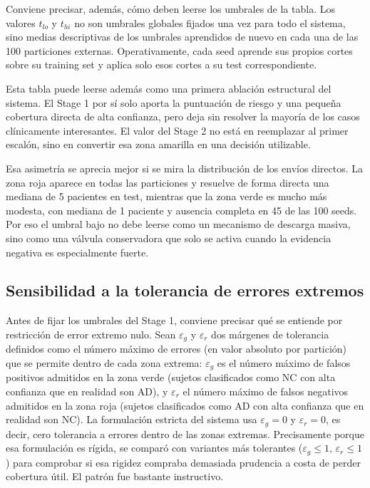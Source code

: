 Conviene precisar, además, cómo deben leerse los umbrales de la tabla. Los valores $t_{lo}$ y $t_{hi}$ no son umbrales
globales fijados una vez para todo el sistema, sino medias descriptivas de los umbrales aprendidos de nuevo en cada una
de las 100 particiones externas. Operativamente, cada seed aprende sus propios cortes sobre su training set y aplica
solo esos cortes a su test correspondiente.

Esta tabla puede leerse además como una primera ablación estructural del sistema. El Stage 1 por sí solo aporta la
puntuación de riesgo y una pequeña cobertura directa de alta confianza, pero deja sin resolver la mayoría de los casos
clínicamente interesantes. El valor del Stage 2 no está en reemplazar al primer escalón, sino en convertir esa zona
amarilla en una decisión utilizable.

Esa asimetría se aprecia mejor si se mira la distribución de los envíos directos. La zona roja aparece en todas las
particiones y resuelve de forma directa una mediana de 5 pacientes en test, mientras que la zona verde es mucho más
modesta, con mediana de 1 paciente y ausencia completa en 45 de las 100 seeds. Por eso el umbral bajo no debe leerse
como un mecanismo de descarga masiva, sino como una válvula conservadora que solo se activa cuando la evidencia negativa
es especialmente fuerte.

\subsection{Sensibilidad a la tolerancia de errores extremos}

Antes de fijar los umbrales del Stage 1, conviene precisar qué se entiende por restricción de error extremo nulo. Sean $\varepsilon_g$ y $\varepsilon_r$ dos márgenes de tolerancia definidos como el número máximo de errores (en valor absoluto por partición) que se permite dentro de cada zona extrema: $\varepsilon_g$ es el número máximo de falsos positivos admitidos en la zona verde (sujetos clasificados como NC con alta confianza que en realidad son AD), y $\varepsilon_r$ el número máximo de falsos negativos admitidos en la zona roja (sujetos clasificados como AD con alta confianza que en realidad son NC). La formulación estricta del sistema usa $\varepsilon_g=0$ y $\varepsilon_r=0$, es decir, cero tolerancia a errores dentro de las zonas extremas. Precisamente porque esa formulación es rígida, se comparó con variantes más tolerantes ($\varepsilon_g\leq 1$, $\varepsilon_r\leq 1$) para comprobar si esa rigidez compraba demasiada prudencia a costa de perder cobertura útil. El patrón fue bastante instructivo.

